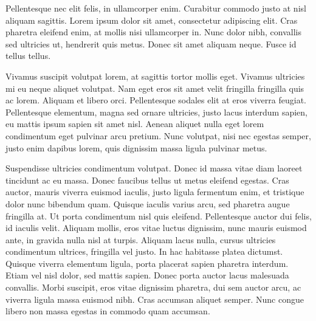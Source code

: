 Pellentesque nec elit felis, in ullamcorper enim. Curabitur commodo justo at nisl aliquam sagittis. Lorem ipsum dolor sit amet, consectetur adipiscing elit. Cras pharetra eleifend enim, at mollis nisi ullamcorper in. Nunc dolor nibh, convallis sed ultricies ut, hendrerit quis metus. Donec sit amet aliquam neque. Fusce id tellus tellus. 

Vivamus suscipit volutpat lorem, at sagittis tortor mollis eget. Vivamus ultricies mi eu neque aliquet volutpat. Nam eget eros sit amet velit fringilla fringilla quis ac lorem. Aliquam et libero orci. Pellentesque sodales elit at eros viverra feugiat. Pellentesque elementum, magna sed ornare ultricies, justo lacus interdum sapien, eu mattis ipsum sapien sit amet nisl. Aenean aliquet nulla eget lorem condimentum eget pulvinar arcu pretium. Nunc volutpat, nisi nec egestas semper, justo enim dapibus lorem, quis dignissim massa ligula pulvinar metus. 

Suspendisse ultricies condimentum volutpat. Donec id massa vitae diam laoreet tincidunt ac eu massa. Donec faucibus tellus ut metus eleifend egestas. Cras auctor, mauris viverra euismod iaculis, justo ligula fermentum enim, et tristique dolor nunc bibendum quam. Quisque iaculis varius arcu, sed pharetra augue fringilla at. Ut porta condimentum nisl quis eleifend. Pellentesque auctor dui felis, id iaculis velit. Aliquam mollis, eros vitae luctus dignissim, nunc mauris euismod ante, in gravida nulla nisl at turpis. Aliquam lacus nulla, cursus ultricies condimentum ultrices, fringilla vel justo. In hac habitasse platea dictumst. Quisque viverra elementum ligula, porta placerat sapien pharetra interdum. Etiam vel nisl dolor, sed mattis sapien. Donec porta auctor lacus malesuada convallis. Morbi suscipit, eros vitae dignissim pharetra, dui sem auctor arcu, ac viverra ligula massa euismod nibh. Cras accumsan aliquet semper. Nunc congue libero non massa egestas in commodo quam accumsan. 